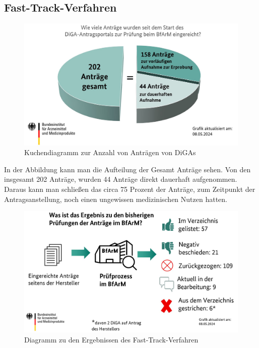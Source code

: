 \documentclass{article}
\begin{document}
		\subsection{Fast-Track-Verfahren} 
			\begin{figure}[htbp]
				\includegraphics[width=\textwidth]{./grafiken/Anzahl_Antraege_DiGA}
				\caption[Anzahl Anträge von DiGAs]{Kuchendiagramm zur Anzahl von Anträgen von DiGAs}
				\label{Abb-antragsanzahl-diga}
			\end{figure}
			In der Abbildung kann man die Aufteilung der Gesamt Anträge sehen. Von den insgesamt 202 Anträge, wurden 44 Anträge direkt dauerhaft aufgenommen. Daraus kann man schließen das circa 75 Prozent der Anträge, zum Zeitpunkt der Antragsanstellung, noch einen ungewissen medizinischen Nutzen hatten.
			\newpage
			\begin{figure}[htbp]
				\includegraphics[width=\textwidth]{./grafiken/Ergebnis_Pruefungen_DiGA}
				\caption[Abbildung zu den Ergebnissen des Fast-Track-Verfahren]{Diagramm zu den Ergebnissen des Fast-Track-Verfahren}
				\label{Abb-ergebnisse-ft}
			\end{figure} 
\end{document}
